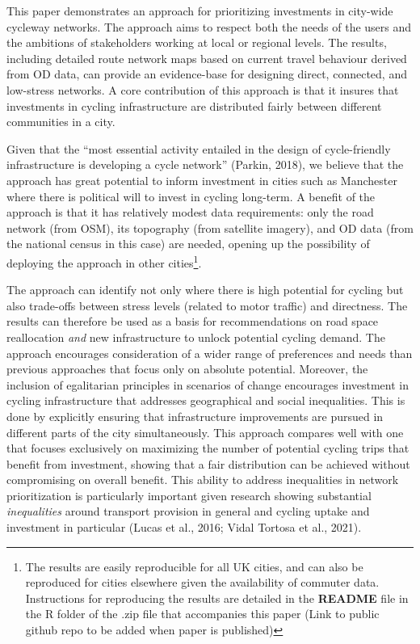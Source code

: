 \documentclass[
]{article}
\begin{document}
This paper demonstrates an approach for prioritizing investments in city-wide cycleway networks.
The approach aims to respect both the needs of the users and the ambitions of stakeholders working at local or regional levels.
The results, including detailed route network maps based on current travel behaviour derived from OD data, can provide an evidence-base for designing direct, connected, and low-stress networks.
A core contribution of this approach is that it insures that investments in cycling infrastructure are distributed fairly between different communities in a city.

Given that the ``most essential activity entailed in the design of cycle-friendly infrastructure is developing a cycle network'' (Parkin, 2018), we believe that the approach has great potential to inform investment in cities such as Manchester where there is political will to invest in cycling long-term.
A benefit of the approach is that it has relatively modest data requirements: only the road network (from OSM), its topography (from satellite imagery), and OD data (from the national census in this case) are needed, opening up the possibility of deploying the approach in other cities\footnote{The results are easily reproducible for all UK cities, and can also be reproduced for cities elsewhere given the availability of commuter data.
  Instructions for reproducing the results are detailed in the \textbf{README} file in the R folder of the .zip file that accompanies this paper (Link to public github repo to be added when paper is published)}.

The approach can identify not only where there is high potential for cycling but also trade-offs between stress levels (related to motor traffic) and directness.
The results can therefore be used as a basis for recommendations on road space reallocation \emph{and} new infrastructure to unlock potential cycling demand.
The approach encourages consideration of a wider range of preferences and needs than previous approaches that focus only on absolute potential.
Moreover, the inclusion of egalitarian principles in scenarios of change encourages investment in cycling infrastructure that addresses geographical and social inequalities.
This is done by explicitly ensuring that infrastructure improvements are pursued in different parts of the city simultaneously.
This approach compares well with one that focuses exclusively on maximizing the number of potential cycling trips that benefit from investment, showing that a fair distribution can be achieved without compromising on overall benefit.
This ability to address inequalities in network prioritization is particularly important given research showing substantial \emph{inequalities} around transport provision in general and cycling uptake and investment in particular (Lucas et al., 2016; Vidal Tortosa et al., 2021).
\end{document}
